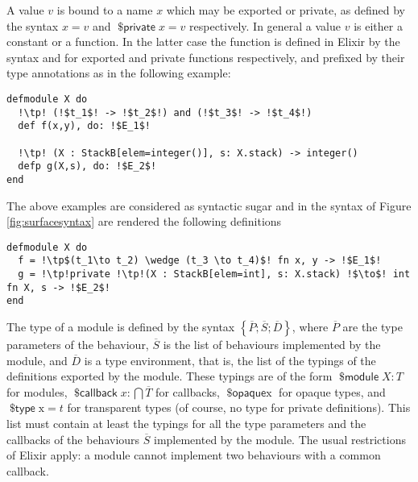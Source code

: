 \documentclass[a4paper,10pt]{article}
\DeclareMathOperator{\kwopq}{\textsf{\$opaque}}
\DeclareMathOperator{\kwtp}{\textsf{\$type}}
\DeclareMathOperator{\kwpr}{\textsf{\$private}}
\DeclareMathOperator{\kwmdl}{\textsf{\$module}}
\DeclareMathOperator{\kwclbk}{\textsf{\$callback}}
\newcommand{\tx}{\textrm{x}}
\begin{document}
A value $v$ is bound to a name $x$ which may be exported or private, as defined by the syntax $x = v$ and $\kwpr x = v$ respectively. In general a value $v$ is either a constant or a function. In the latter case the function is defined in Elixir by the syntax  and  for exported and private functions respectively, and prefixed by their type annotations as in the following example:
\begin{verbatim}
defmodule X do
  !\tp! (!$t_1$! -> !$t_2$!) and (!$t_3$! -> !$t_4$!)
  def f(x,y), do: !$E_1$! 

  !\tp! (X : StackB[elem=integer()], s: X.stack) -> integer()
  defp g(X,s), do: !$E_2$!
end  
\end{verbatim}
The above examples are considered as syntactic sugar and in the syntax of Figure \ref{fig:surfacesyntax} are rendered the following definitions 
\begin{verbatim}
defmodule X do
  f = !\tp$(t_1\to t_2) \wedge (t_3 \to t_4)$! fn x, y -> !$E_1$!
  g = !\tp!private !\tp!(X : StackB[elem=int], s: X.stack) !$\to$! int fn X, s -> !$E_2$!
end
\end{verbatim}

The type of a module is defined by the syntax $\left\{\overline{P};\overline{S};\overline{D}\right\}$, where $\overline{P}$ are the type parameters of the behaviour, $\overline{S}$ is the list of behaviours implemented by the module, and $\overline{D}$ is a type environment, that is, the list of the typings of the definitions exported by the module. These typings are of the form $\kwmdl X : T$ for modules, $\kwclbk x : \bigcap \overline{T}$ for callbacks, $\kwopq \tx$ for opaque types, and $\kwtp \tx = t$ for transparent types (of course, no type for private definitions). This list must contain at least the typings for all the type parameters and the callbacks of the behaviours $\overline{S}$ implemented by the module. The usual restrictions of Elixir apply: a module cannot implement two  behaviours with a common callback. 
\end{document}
